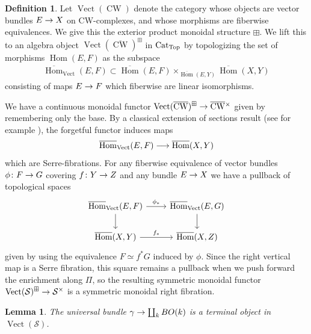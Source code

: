 \documentclass[10pt]{amsart}
\numberwithin{equation}{section}
\newtheorem{lem}[prop]{Lemma}
\theoremstyle{definition}
\newtheorem{definition}[prop]{Definition}
\DeclareMathOperator{\Hom}{Hom}
\DeclareMathOperator{\Top}{Top}
\DeclareMathOperator{\Vect}{Vect}
\DeclareMathOperator{\CW}{CW}
\newcommand{\Cat}{\mathrm{Cat}\vphantom{t}}
\newcommand{\cS}{\mathcal{S}}
\renewcommand{\to}{\mathchoice{\longrightarrow}{\rightarrow}{}{}}
\begin{document}
\begin{definition}\label{def:Vect(Top)}
	Let $\Vect(\CW)$ denote the category whose objects are vector bundles $E\to X$ on CW-complexes, and whose morphisms are fiberwise equivalences. We give this the exterior product monoidal structure $\boxplus$. We lift this to an algebra object $\Vect(\overline{\CW})^{\boxplus}$ in $\Cat_{\Top}$ by topologizing the set of morphisms $\Hom(E,F)$ as the subspace
	\begin{align*}
		\overline{\Hom}_{\Vect}(E,F) \subset \overline{\Hom}(E,F)\times_{\overline{\Hom}(E,Y) } \overline{\Hom}(X,Y)
	\end{align*}
	consisting of maps $E\to F$ which fiberwise are linear isomorphisms.
\end{definition}
We have a continuous monoidal functor $\Vect(\overline{\CW})^{\boxplus} \to \overline{\CW}\vphantom{p}^{\times}$ given by remembering only the base. By a classical extension of sections result (see for example \cite[Theorem 5.7]{karoubi2009k}), the forgetful functor induces maps
\begin{align*}
	\overline{\Hom}_{\Vect}(E,F) \to \overline{\Hom}(X,Y)
\end{align*}
which are Serre-fibrations.
For any fiberwise equivalence of vector bundles $\phi\colon F\to G$ covering $f\colon Y\to Z$ and any bundle $E\to X$ we have a pullback of topological spaces
\begin{equation*}
	\begin{tikzcd}
		\overline{\Hom}_{\Vect}(E,F)  \arrow[r, "\phi_{*}"] \arrow[d]      &   \overline{\Hom}_{\Vect}(E,G)  \arrow[d] \\
		\overline{\Hom}(X,Y)  \arrow[r, "f_{*}"]               &  \overline{\Hom}(X,Z)
	\end{tikzcd}
\end{equation*}
given by using the equivalence $F \simeq f^{*}G$ induced by $\phi$. Since the right vertical map is a Serre fibration, this square remains a pullback when we push forward the enrichment along $\Pi$, so the resulting symmetric monoidal functor $\Vect(\cS)^{\boxplus} \to \cS^{\times}$ is a symmetric monoidal right fibration.
\begin{lem}\label{lem:Vect(S)_terminal}
	The universal bundle $\gamma \to \coprod_{k}BO(k)$ is a terminal object in $\Vect(\cS)$.
\end{lem}
\end{document}
